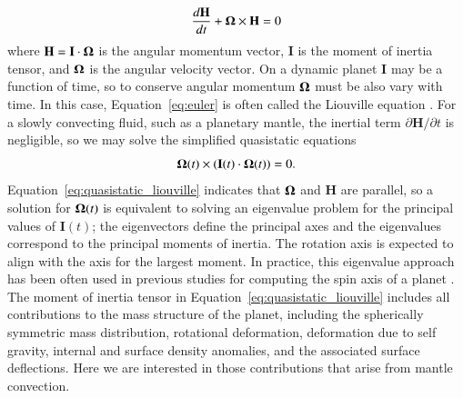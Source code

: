 \documentclass[preprint,12pt,authoryear]{elsarticle}
\newcommand{\mitbf}[1]{\hbox{\mathversion{bold}$#1$}}
\begin{document}
\begin{equation}
\frac{d \mathbf{H}}{dt} + \mitbf{\Omega} \times \mathbf{H} = 0
\label{eq:euler}
\end{equation}
where $\mathbf{H} = \mathbf{I} \cdot \mitbf{\Omega}$ is the angular momentum vector, $\mathbf{I}$ is the moment of inertia tensor, and $\mitbf{\Omega}$ is the angular velocity vector.
On a dynamic planet $\mathbf{I}$ may be a function of time, so to conserve angular momentum $\mitbf{\Omega}$ must be also vary with time.
In this case, Equation~\eqref{eq:euler} is often called the Liouville equation \citep[e.g.][]{munk1960rotation}.
For a slowly convecting fluid, such as a planetary mantle, the inertial term $\partial \mathbf{H} / \partial t$ is negligible, so we may solve the simplified quasistatic equations
\begin{equation}
\mitbf{\Omega } (t)\times ( \mathbf{I}(t) \cdot \mitbf{\Omega }(t) ) = 0.
\label{eq:quasistatic_liouville}
\end{equation}
Equation~\eqref{eq:quasistatic_liouville} indicates that $\mitbf{\Omega}$ and $\mathbf{H}$ are parallel, so a solution for $\mitbf{\Omega}(t)$ is equivalent to solving an eigenvalue problem for the principal values of $\mathbf{I}(t)$;  the eigenvectors define the principal axes and the eigenvalues correspond to the principal moments of inertia. The rotation axis is expected to align with the axis for the largest moment.  
In practice, this eigenvalue approach has been often used in previous studies for computing the spin axis of a planet \citep[e.g.][]{steinberger1997changes, roberts2007cause}.
The moment of inertia tensor in Equation~\eqref{eq:quasistatic_liouville} includes all contributions to the mass structure
of the planet, including the spherically symmetric mass distribution, rotational deformation, deformation due to self gravity, internal and surface density anomalies, and the associated surface deflections.
Here we are interested in those contributions that arise from mantle convection.
\end{document}
